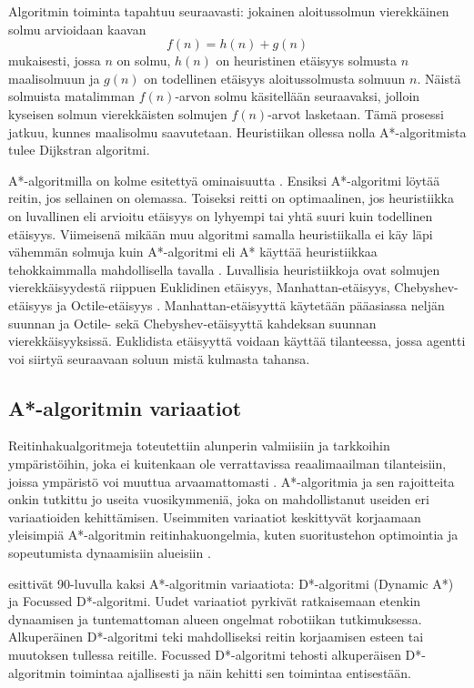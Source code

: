 \documentclass[utf8]{gradu3}
\begin{document}
Algoritmin toiminta tapahtuu seuraavasti: jokainen aloitussolmun vierekkäinen solmu arvioidaan kaavan \[f(n)=h(n)+g(n)\] mukaisesti, jossa \(n\) on solmu, \(h(n)\) on heuristinen etäisyys solmusta \(n\) maalisolmuun ja \(g(n)\) on todellinen etäisyys aloitussolmusta solmuun \(n\). Näistä solmuista matalimman \(f(n)\)-arvon solmu käsitellään seuraavaksi, jolloin kyseisen solmun vierekkäisten solmujen \(f(n)\)-arvot lasketaan. Tämä prosessi jatkuu, kunnes maalisolmu saavutetaan. Heuristiikan ollessa nolla A*-algoritmista tulee Dijkstran algoritmi.

A*-algoritmilla on kolme esitettyä ominaisuutta \parencite{hart1968formal}. Ensiksi A*-algoritmi löytää reitin, jos sellainen on olemassa. Toiseksi reitti on optimaalinen, jos heuristiikka on luvallinen eli arvioitu etäisyys on lyhyempi tai yhtä suuri kuin todellinen etäisyys. Viimeisenä mikään muu algoritmi samalla heuristiikalla ei käy läpi vähemmän solmuja kuin A*-algoritmi eli A* käyttää heuristiikkaa tehokkaimmalla mahdollisella tavalla \parencite{cui2011based,hart1968formal}. Luvallisia heuristiikkoja ovat solmujen vierekkäisyydestä riippuen Euklidinen etäisyys, Manhattan-etäisyys, Chebyshev-etäisyys ja Octile-etäisyys \parencite{duchovn2014path,botea2013pathfinding}. Manhattan-etäisyyttä käytetään pääasiassa neljän suunnan ja Octile- sekä Chebyshev-etäisyyttä kahdeksan suunnan vierekkäisyyksissä. Euklidista etäisyyttä voidaan käyttää tilanteessa, jossa agentti voi siirtyä seuraavaan soluun mistä kulmasta tahansa.

\subsection{A*-algoritmin variaatiot}
\label{avariaatiot}

Reitinhakualgoritmeja toteutettiin alunperin valmiisiin ja tarkkoihin ympäristöihin, joka ei kuitenkaan ole verrattavissa reaalimaailman tilanteisiin, joissa ympäristö voi muuttua arvaamattomasti \parencite{lawande2022systematic}. A*-algoritmia ja sen rajoitteita onkin tutkittu jo useita vuosikymmeniä, joka on mahdollistanut useiden eri variaatioiden kehittämisen. Useimmiten variaatiot keskittyvät korjaamaan yleisimpiä A*-algoritmin reitinhakuongelmia, kuten suoritustehon optimointia ja sopeutumista dynaamisiin alueisiin \parencite{stentz1994optimal}.

\textcite{stentz1994optimal,stentz1995focussed} esittivät 90-luvulla kaksi A*-algoritmin variaatiota: D*-algoritmi (Dynamic A*) ja Focussed D*-algoritmi. Uudet variaatiot pyrkivät ratkaisemaan etenkin dynaamisen ja tuntemattoman alueen ongelmat robotiikan tutkimuksessa. Alkuperäinen D*-algoritmi teki mahdolliseksi reitin korjaamisen esteen tai muutoksen tullessa reitille. Focussed D*-algoritmi tehosti alkuperäisen D*-algoritmin toimintaa ajallisesti ja näin kehitti sen toimintaa entisestään.
\end{document}
